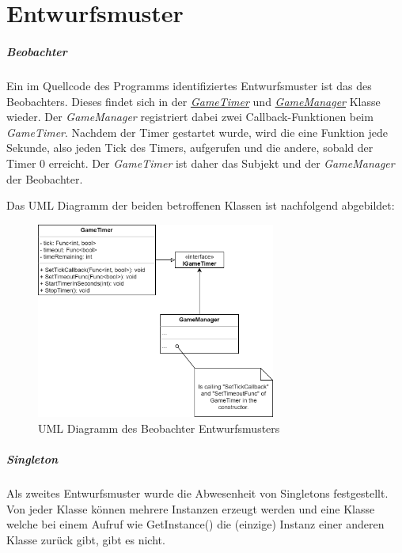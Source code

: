 \chapter{Entwurfsmuster}
\paragraph{Beobachter}
Ein im Quellcode des Programms identifiziertes Entwurfsmuster ist das des Beobachters. Dieses findet sich in der \href{https://github.com/EinToni/Wortfinder/blob/main/Wortfinder/GameTimer.cs}{\textit{GameTimer}} und \href{https://github.com/EinToni/Wortfinder/blob/main/Wortfinder/GameManager.cs}{\textit{GameManager}} Klasse wieder. Der \textit{GameManager} registriert dabei zwei Callback-Funktionen beim \textit{GameTimer}. Nachdem der Timer gestartet wurde, wird die eine Funktion jede Sekunde, also jeden Tick des Timers, aufgerufen und die andere, sobald der Timer 0 erreicht. Der \textit{GameTimer} ist daher das Subjekt und der \textit{GameManager} der Beobachter.

Das UML Diagramm der beiden betroffenen Klassen ist nachfolgend abgebildet:

\begin{figure}[htb]
\centering
\includegraphics[width=0.7\textwidth]{Bilder/Entwurfsmuster.PNG}
\caption{\label{Abb:Entwurfsmuster}UML Diagramm des Beobachter Entwurfsmusters}
\end{figure}

\paragraph{Singleton}
Als zweites Entwurfsmuster wurde die Abwesenheit von Singletons festgestellt. Von jeder Klasse können mehrere Instanzen erzeugt werden und eine Klasse welche bei einem Aufruf wie \glqq GetInstance()\grqq{} die (einzige) Instanz einer anderen Klasse zurück gibt, gibt es nicht.

\endinput